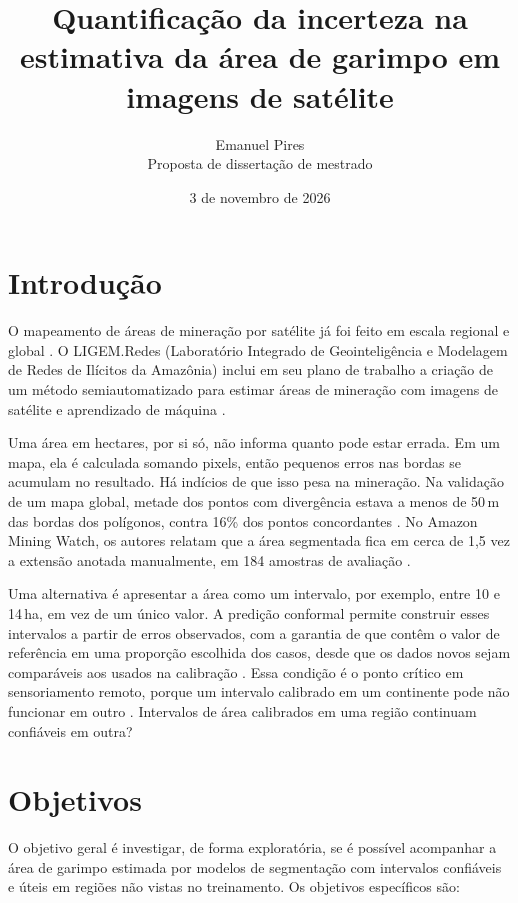 \documentclass[11pt,a4paper]{article}
\title{Quantificação da incerteza na estimativa da área de garimpo em imagens de satélite}
\author{Emanuel Pires\\[2pt] \small Proposta de dissertação de mestrado}
\date{3 de novembro de 2026}
\begin{document}
\maketitle

\section{Introdução}

O mapeamento de áreas de mineração por satélite já foi feito em escala regional e global
\cite{couttenier2022,tang2023,jasansky2025}. O LIGEM.Redes (Laboratório Integrado de Geointeligência e Modelagem de
Redes de Ilícitos da Amazônia) inclui em seu plano de trabalho a criação de um método semiautomatizado para estimar áreas de mineração com imagens de satélite e aprendizado de máquina \cite{ligemprojetos}.

Uma área em hectares, por si só, não informa quanto pode estar errada. Em um mapa, ela é calculada somando pixels, então pequenos erros nas bordas se acumulam no resultado. Há indícios de que isso pesa na mineração. Na
validação de um mapa global, metade dos pontos com divergência estava a menos de 50\,m das bordas dos polígonos, contra
16\% dos pontos concordantes \cite{maus2020}. No Amazon Mining Watch, os autores relatam que a área segmentada fica em
cerca de 1,5 vez a extensão anotada manualmente, em 184 amostras de avaliação \cite{amw2026}.

Uma alternativa é apresentar a área como um intervalo, por exemplo, entre 10 e 14\,ha, em vez de um único valor. A
predição conformal permite construir esses intervalos a partir de erros observados, com a garantia de que contêm o valor
de referência em uma proporção escolhida dos casos, desde que os dados novos sejam comparáveis aos usados na calibração
\cite{lei2018}. Essa condição é o ponto crítico em sensoriamento remoto, porque um intervalo calibrado em um continente
pode não funcionar em outro \cite{tibshirani2019,barber2023}. Intervalos de área calibrados em uma região continuam
confiáveis em outra?

\section{Objetivos}

O objetivo geral é investigar, de forma exploratória, se é possível acompanhar a área de garimpo estimada por
modelos de segmentação com intervalos confiáveis e úteis em regiões não vistas no treinamento. Os objetivos
específicos são:
\end{document}
